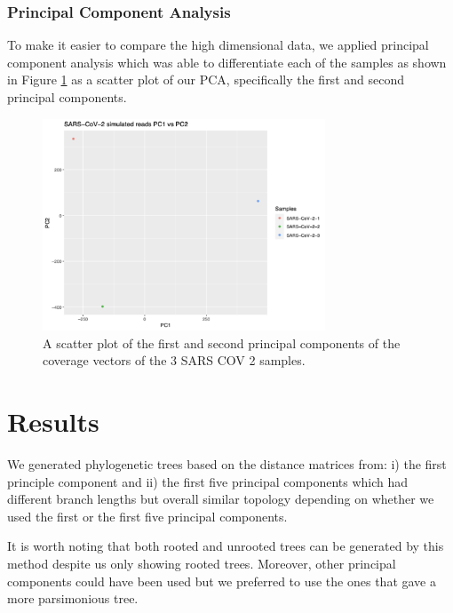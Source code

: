 \documentclass[10pt, a4paper]{article}
\begin{document}
\newpage
\subsubsection{Principal Component Analysis}
\label{sec:orgc5774d1}
To make it easier to compare the high dimensional data, we applied principal 
component analysis which was able to differentiate each of the samples as shown
in Figure \ref{fig:orgf5fd02e} as a scatter plot of our PCA, specifically the first and 
second principal components.

\begin{figure}[h]
\centering
\includegraphics[width=0.75\textwidth]{../Figures/SARS_CoV_2/PCA.png}
\caption[SARS-CoV-2 PCA]{\label{fig:orgf5fd02e}A scatter plot of the first and second principal components of the coverage vectors of the 3 SARS COV 2 samples.}
\end{figure}

\clearpage
\section{Results}
\label{sec:org7f2d497}
We generated phylogenetic trees based on the distance matrices from: i) the first 
principle component and ii) the first five principal components which had 
different branch lengths but overall similar topology depending on whether we 
used the first or the first five principal components. 

It is worth noting that both rooted and unrooted trees can be generated by this
method despite us only showing rooted trees. Moreover, other principal
components could have been used but we preferred to use the ones that gave a 
more parsimonious tree.


\end{document}
